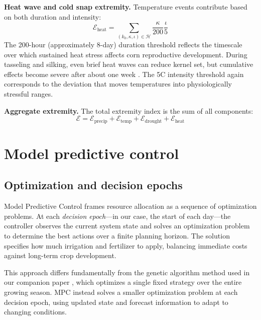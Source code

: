 \documentclass[preprint,12pt]{elsarticle}
\newcommand{\df}[2]{\displaystyle\frac{#1}{#2}}
\begin{document}
\noindent\textbf{Heat wave and cold snap extremity.} Temperature events contribute based on both duration and intensity:
\begin{equation}
\mathcal{E}_{\text{heat}} = \sum_{(k_{0}, \kappa, \iota)\in\mathcal{H}} \df{\kappa}{200}\df{\iota}{5}
\label{eqn:extreme-heatwave}
\end{equation}
The 200-hour (approximately 8-day) duration threshold reflects the timescale over which sustained heat stress affects corn reproductive development. During tasseling and silking, even brief heat waves can reduce kernel set, but cumulative effects become severe after about one week \cite{hatfield2015temperature}. The 5\textdegree C intensity threshold again corresponds to the deviation that moves temperatures into physiologically stressful ranges.

\noindent\textbf{Aggregate extremity.} The total extremity index is the sum of all components:
\begin{equation}
\mathcal{E} = \mathcal{E}_{\text{precip}} + \mathcal{E}_{\text{temp}} + \mathcal{E}_{\text{drought}} + \mathcal{E}_{\text{heat}}
\label{eqn:extremity}
\end{equation}

\section{Model predictive control}\label{sec:mpc}

\subsection{Optimization and decision epochs}\label{subsec:optimization}

Model Predictive Control frames resource allocation as a sequence of optimization problems. At each \emph{decision epoch}---in our case, the start of each day---the controller observes the current system state and solves an optimization problem to determine the best actions over a finite planning horizon. The solution specifies how much irrigation and fertilizer to apply, balancing immediate costs against long-term crop development.

This approach differs fundamentally from the genetic algorithm method used in our companion paper \cite{becker2025ga}, which optimizes a single fixed strategy over the entire growing season. MPC instead solves a smaller optimization problem at each decision epoch, using updated state and forecast information to adapt to changing conditions.
\end{document}
